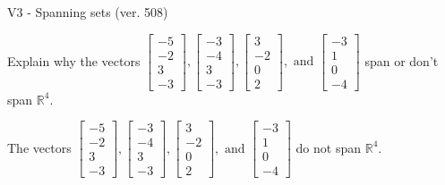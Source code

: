 \begin{exercise}
  \begin{exerciseTitle}V3 - Spanning sets (ver. 508)\end{exerciseTitle}
  \begin{exerciseStatement}
    Explain why the vectors \(\left[\begin{array}{r}
-5 \\
-2 \\
3 \\
-3
\end{array}\right] , \left[\begin{array}{r}
-3 \\
-4 \\
3 \\
-3
\end{array}\right] , \left[\begin{array}{r}
3 \\
-2 \\
0 \\
2
\end{array}\right] , \text{ and } \left[\begin{array}{r}
-3 \\
1 \\
0 \\
-4
\end{array}\right]\) span or don't span \(\mathbb{R}^4\). 
	


  \end{exerciseStatement}
  \begin{exerciseAnswer}
   The vectors \(\left[\begin{array}{r}
-5 \\
-2 \\
3 \\
-3
\end{array}\right] , \left[\begin{array}{r}
-3 \\
-4 \\
3 \\
-3
\end{array}\right] , \left[\begin{array}{r}
3 \\
-2 \\
0 \\
2
\end{array}\right] , \text{ and } \left[\begin{array}{r}
-3 \\
1 \\
0 \\
-4
\end{array}\right]\) 
  	 do not  
	span \(\mathbb{R}^4\).
  


  \end{exerciseAnswer}
\end{exercise}